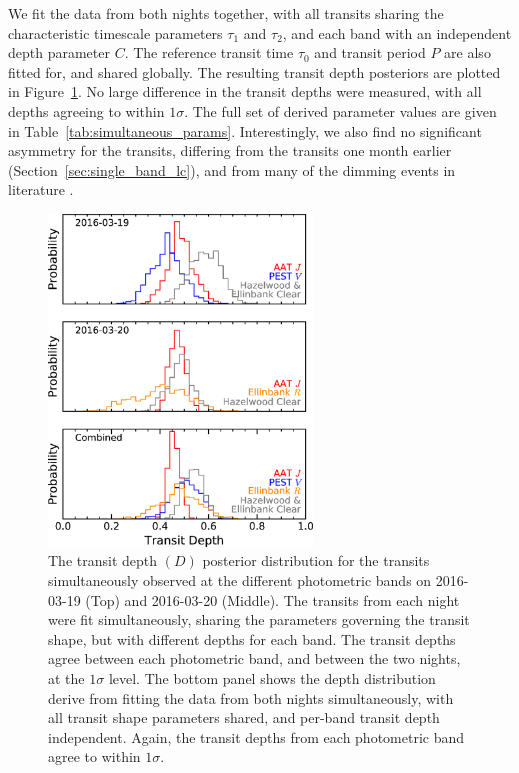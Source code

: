 \documentclass[apj]{emulateapj}
\begin{document}
We fit the data from both nights together, with all transits sharing the characteristic timescale parameters $\tau_1$ and $\tau_2$, and each band with an independent depth parameter $C$. The reference transit time $\tau_0$ and transit period $P$ are also fitted for, and shared globally. The resulting transit depth posteriors are plotted in Figure~\ref{fig:depth_hist}. No large difference in the transit depths were measured, with all depths agreeing to within $1\sigma$. The full set of derived parameter values are given in Table~\ref{tab:simultaneous_params}. Interestingly, we also find no significant asymmetry for the transits, differing from the transits one month earlier (Section~\ref{sec:single_band_lc}), and from many of the dimming events in literature \citep[e.g. FLWO transits from ][]{2015Natur.526..546V}. 

\begin{figure}
    \vspace{5mm}
    \centering
    \includegraphics[width=7cm]{plots/depth_hist.eps}
    \caption{The transit depth $(D)$ posterior distribution for the transits simultaneously observed at the different photometric bands on 2016-03-19 (Top) and 2016-03-20 (Middle). The transits from each night were fit simultaneously, sharing the parameters governing the transit shape, but with different depths for each band. The transit depths agree between each photometric band, and between the two nights, at the $1\sigma$ level. The bottom panel shows the depth distribution derive from fitting the data from both nights simultaneously, with all transit shape parameters shared, and per-band transit depth independent. Again, the transit depths from each photometric band agree to within $1\sigma$.}
    \label{fig:depth_hist}
\end{figure}
\end{document}
